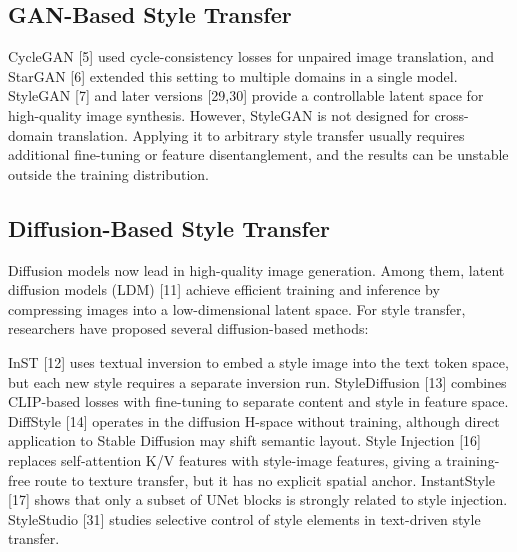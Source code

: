 \documentclass[10pt,twocolumn]{article}
\begin{document}
\subsection{GAN-Based Style Transfer}

CycleGAN [5] used cycle-consistency losses for unpaired image translation, and StarGAN [6] extended this setting to multiple domains in a single model. StyleGAN [7] and later versions [29,30] provide a controllable latent space for high-quality image synthesis. However, StyleGAN is not designed for cross-domain translation. Applying it to arbitrary style transfer usually requires additional fine-tuning or feature disentanglement, and the results can be unstable outside the training distribution.

\subsection{Diffusion-Based Style Transfer}

Diffusion models now lead in high-quality image generation. Among them, latent diffusion models (LDM) [11] achieve efficient training and inference by compressing images into a low-dimensional latent space. For style transfer, researchers have proposed several diffusion-based methods:

InST [12] uses textual inversion to embed a style image into the text token space, but each new style requires a separate inversion run. StyleDiffusion [13] combines CLIP-based losses with fine-tuning to separate content and style in feature space. DiffStyle [14] operates in the diffusion H-space without training, although direct application to Stable Diffusion may shift semantic layout. Style Injection [16] replaces self-attention K/V features with style-image features, giving a training-free route to texture transfer, but it has no explicit spatial anchor. InstantStyle [17] shows that only a subset of UNet blocks is strongly related to style injection. StyleStudio [31] studies selective control of style elements in text-driven style transfer.
\end{document}
